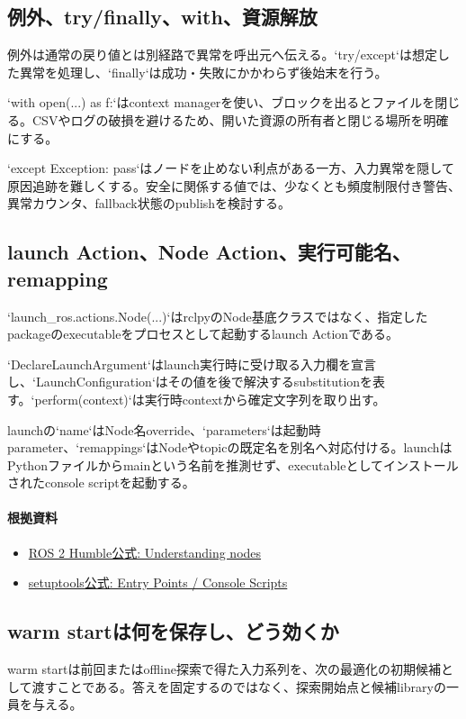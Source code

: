 \documentclass[a4paper,11pt]{article}
\begin{document}
\subsection{例外、try/finally、with、資源解放}
例外は通常の戻り値とは別経路で異常を呼出元へ伝える。`try/except`は想定した異常を処理し、`finally`は成功・失敗にかかわらず後始末を行う。


`with open(...) as f:`はcontext managerを使い、ブロックを出るとファイルを閉じる。CSVやログの破損を避けるため、開いた資源の所有者と閉じる場所を明確にする。


`except Exception: pass`はノードを止めない利点がある一方、入力異常を隠して原因追跡を難しくする。安全に関係する値では、少なくとも頻度制限付き警告、異常カウンタ、fallback状態のpublishを検討する。



\subsection{launch Action、Node Action、実行可能名、remapping}
`launch\_ros.actions.Node(...)`はrclpyのNode基底クラスではなく、指定したpackageのexecutableをプロセスとして起動するlaunch Actionである。


`DeclareLaunchArgument`はlaunch実行時に受け取る入力欄を宣言し、`LaunchConfiguration`はその値を後で解決するsubstitutionを表す。`perform(context)`は実行時contextから確定文字列を取り出す。


launchの`name`はNode名override、`parameters`は起動時parameter、`remappings`はNodeやtopicの既定名を別名へ対応付ける。launchはPythonファイルからmainという名前を推測せず、executableとしてインストールされたconsole scriptを起動する。

\paragraph{根拠資料}
\begin{itemize}[leftmargin=1.6em]
\item \href{https://docs.ros.org/en/humble/Tutorials/Beginner-CLI-Tools/Understanding-ROS2-Nodes/Understanding-ROS2-Nodes.html}{ROS 2 Humble公式: Understanding nodes}
\item \href{https://setuptools.pypa.io/en/latest/userguide/entry_point.html}{setuptools公式: Entry Points / Console Scripts}
\end{itemize}

\subsection{warm startは何を保存し、どう効くか}
warm startは前回またはoffline探索で得た入力系列を、次の最適化の初期候補として渡すことである。答えを固定するのではなく、探索開始点と候補libraryの一員を与える。
\end{document}
